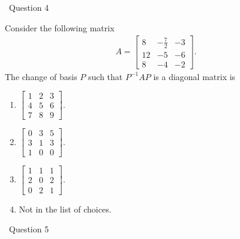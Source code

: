 \documentclass[12pt]{article}
\newcommand{\spc}{\vspace*{0.5cm}}
\newcommand{\ques}[1]{\noindent\hrulefill \, Question #1 \, \hrulefill}
\begin{document}
	\newpage
	
	\ques{4}
	
	Consider the following matrix
		\begin{align*}
		A = \left[\begin{matrix}8 & - \frac{7}{2} & -3\\12 & -5 & -6\\8 & -4 & -2\end{matrix}\right] .
		\end{align*}
	The change of basis $P$ such that $P^{-1} A P$ is a diagonal matrix is
		\begin{multicols}{2}
		\begin{enumerate}[label=\alph*)]
		\item $\begin{bmatrix} 1 & 2 & 3 \\ 4 & 5 & 6 \\ 7 & 8 & 9 \end{bmatrix}$.
		\item $\begin{bmatrix} 0 & 3 & 5 \\ 3 & 1 & 3 \\ 1 & 0 & 0 \end{bmatrix}$.
		\item $\left[\begin{matrix}1 & 1 & 1\\2 & 0 & 2\\0 & 2 & 1\end{matrix}\right]$.
		\item Not in the list of choices.
		\end{enumerate}
		\end{multicols}
		
	\spc
	
	\ques{5}
	
\end{document}
